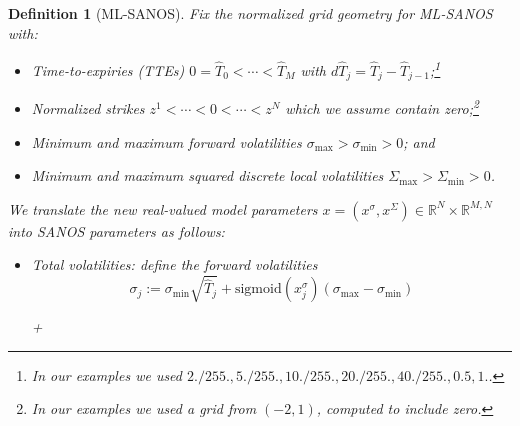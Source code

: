 \documentclass[11pt,a4paper]{article}
\newtheorem{definition}{Definition}[section]
\newcommand{\R}{\mathbb{R}}
\DeclareRobustCommand{\eqx}{\begin{equation}}                                         %
\DeclareRobustCommand{\eqend}{\end{equation}}                                         %
\begin{document}
\begin{definition}[ML-SANOS]
    Fix the normalized grid geometry for ML-SANOS with:
    \begin{itemize}
        \item Time-to-expiries (TTEs) $0=\hat T_0<\cdots<\hat T_M$ with
        $d\hat T_j = \hat T_j-\hat T_{j-1}$;\footnote{
            In our examples we used $2./255., 5./255., 10./255., 20./255., 40./255.,0.5,1.$.        
        }
        \item Normalized strikes $z^1<\cdots<0<\cdots<z^N$ which we assume contain zero;\footnote{
            In our examples we used a grid from $(-2,1)$, computed to include zero.        
        }
        \item Minimum and maximum forward volatilities $\sigma_{\max} > \sigma_{\min} > 0$; and
        \item Minimum and maximum squared discrete local volatilities $\Sigma_{\max} > \Sigma_{\min} > 0$.
    \end{itemize}
    We translate the new real-valued model parameters $x=(x^\sigma,x^\Sigma)\in \R^N\times \R^{M,N}$ into SANOS parameters as follows:
    \begin{itemize}
        \item Total volatilities: 
        define the forward volatilities
             \eqx
                       \sigma_j := \sigma_{\min}\sqrt{\hat T_j}
               + \mathrm{sigmoid}( x^\sigma_j ) ( \sigma_{\max} - \sigma_{\min} )
            \eqend




















            +
            
                        
                        
                        
                        
                        
                        
                        
                        
                        
                        
                        
                        

\end{itemize}
\end{definition}
\end{document}
